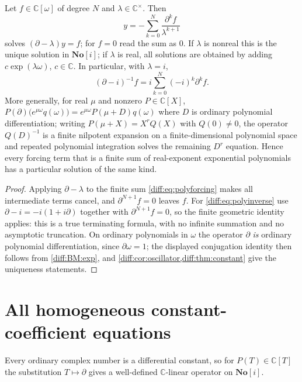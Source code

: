 \documentclass[11pt,letterpaper]{article}
\numberwithin{equation}{section}
\theoremstyle{definition}
\theoremstyle{remark}
\newcommand{\SC}{\mathbf{No}[i]}
\newcommand{\C}{\mathbb C}
\newcommand{\der}{\partial}
\begin{document}
\begin{proposition}
\label{diff:prop:polyforcing}
Let $f\in\C[\omega]$ of degree $N$ and $\lambda\in\C^{\times}$. Then
\begin{equation}\label{diff:eq:polyforcing}
 y=-\sum_{k=0}^{N}\frac{\der^{k}f}{\lambda^{k+1}}
\end{equation}
solves $(\der-\lambda)y=f$; for $f=0$ read the sum as $0$. If $\lambda$ is
nonreal this is the unique solution in $\SC$; if $\lambda$ is real, all
solutions are obtained by adding $c\exp(\lambda\omega)$, $c\in\C$. In
particular, with $\lambda=i$,
\begin{equation}\label{diff:eq:polyinverse}
 (\der-i)^{-1}f=i\sum_{k=0}^{N}(-i)^{k}\der^{k}f .
\end{equation}
More generally, for real $\mu$ and nonzero $P\in\C[X]$,
$P(\der)\bigl(e^{\mu\omega}q(\omega)\bigr)=e^{\mu\omega}P(\mu+D)q(\omega)$
where $D$ is ordinary polynomial differentiation; writing
$P(\mu+X)=X^{r}Q(X)$ with $Q(0)\neq0$, the operator $Q(D)^{-1}$ is a finite
nilpotent expansion on a finite-dimensional polynomial space and repeated
polynomial integration solves the remaining $D^{r}$ equation. Hence every
forcing term that is a finite sum of real-exponent exponential polynomials has
a particular solution of the same kind.
\end{proposition}
\begin{proof}
Applying $\der-\lambda$ to the finite sum \cref{diff:eq:polyforcing} makes all
intermediate terms cancel, and $\der^{N+1}f=0$ leaves $f$. For
\cref{diff:eq:polyinverse} use $\der-i=-i(1+i\der)$ together with
$\der^{N+1}f=0$, so the finite geometric identity applies: this is a true
terminating formula, with no infinite summation and no asymptotic truncation.
On ordinary polynomials in $\omega$ the operator $\der$ \emph{is} ordinary
polynomial differentiation, since $\der\omega=1$; the displayed conjugation
identity then follows from \ref{diff:BM:exp}, and
\cref{diff:cor:oscillator,diff:thm:constant} give the uniqueness statements.
\end{proof}

\section{All homogeneous constant-coefficient equations}
\label{diff:sec:constant}

Every ordinary complex number is a differential constant, so for
$P(T)\in\C[T]$ the substitution $T\mapsto\der$ gives a well-defined
$\C$-linear operator on $\SC$.
\end{document}
